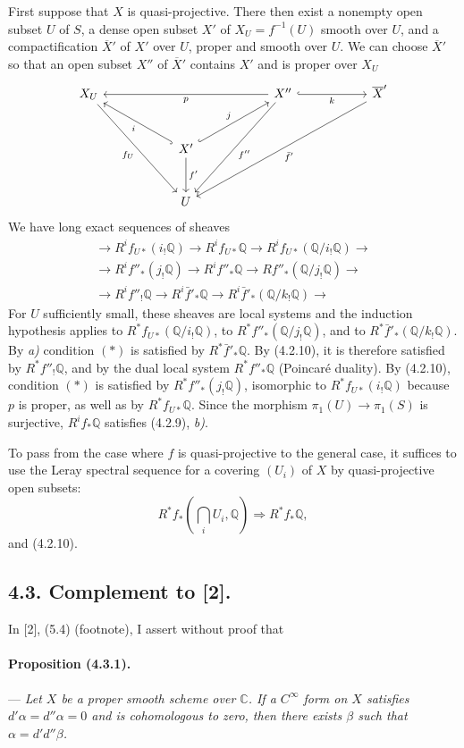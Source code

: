\documentclass[10pt]{article}
\newcommand{\C}{\mathbb C}
\newcommand{\Q}{\mathbb Q}
\begin{document}
First suppose that $X$ is quasi-projective. There then exist a nonempty open subset $U$ of $S$, a dense open subset $X'$ of $X_U=f^{-1}(U)$ smooth over $U$, and a compactification $\overline X'$ of $X'$ over $U$, proper and smooth over $U$. We can choose $\overline X'$ so that an open subset $X''$ of $\overline X'$ contains $X'$ and is proper over $X_U$
\[
\begin{tikzcd}[column sep=2.8em,row sep=2.8em]
X_U \arrow[ddrr,"f_U"'] &&&&
X'' \arrow[llll,"p"] \arrow[rr,hook,"k"'] \arrow[ddll,"f''"] &&
\overline X' \arrow[ddllll,"\bar f'"] \\
&& X' \arrow[ull,hook,"i"] \arrow[urr,hook,"j"] \arrow[d,"f'"] &&&& \\
&& U &&&&
\end{tikzcd}
\]
We have long exact sequences of sheaves
\[
\begin{gathered}
\to R^if_{U*}(i_!\Q)\to R^if_{U*}\Q\to R^if_{U*}(\Q/i_!\Q)\to\\
\to R^if''_*(j_!\Q)\to R^if''_*\Q\to Rf''_*(\Q/j_!\Q)\to\\
\to R^if''_!\Q\to R^i\bar f'_*\Q\to R^i\bar f'_*(\Q/k_!\Q)\to
\end{gathered}
\]
For $U$ sufficiently small, these sheaves are local systems and the induction hypothesis applies to $R^*f_{U*}(\Q/i_!\Q)$, to $R^*f''_*(\Q/j_!\Q)$, and to $R^*\bar f'_*(\Q/k_!\Q)$. By \textit{a)} condition $(*)$ is satisfied by $R^*\bar f'_*\Q$. By (4.2.10), it is therefore satisfied by $R^*f''_!\Q$, and by the dual local system $R^*f''_*\Q$ (Poincaré duality). By (4.2.10), condition $(*)$ is satisfied by $R^*f''_*(j_!\Q)$, isomorphic to $R^*f_{U*}(i_!\Q)$ because $p$ is proper, as well as by $R^*f_{U*}\Q$. Since the morphism $\pi_1(U)\to\pi_1(S)$ is surjective, $R^if_*\Q$ satisfies (4.2.9), \textit{b)}.

To pass from the case where $f$ is quasi-projective to the general case, it suffices to use the Leray spectral sequence for a covering $(U_i)$ of $X$ by quasi-projective open subsets:
\[
R^*f_*(\bigcap_iU_i,\Q)\Rightarrow R^*f_*\Q,
\]
and (4.2.10).

\subsection*{4.3. Complement to [2].}

In [2], (5.4) (footnote), I assert without proof that

\paragraph{Proposition (4.3.1).} --- {\itshape Let $X$ be a proper smooth scheme over $\C$. If a $C^\infty$ form on $X$ satisfies $d'\alpha=d''\alpha=0$ and is cohomologous to zero, then there exists $\beta$ such that $\alpha=d'd''\beta$.}
\end{document}
